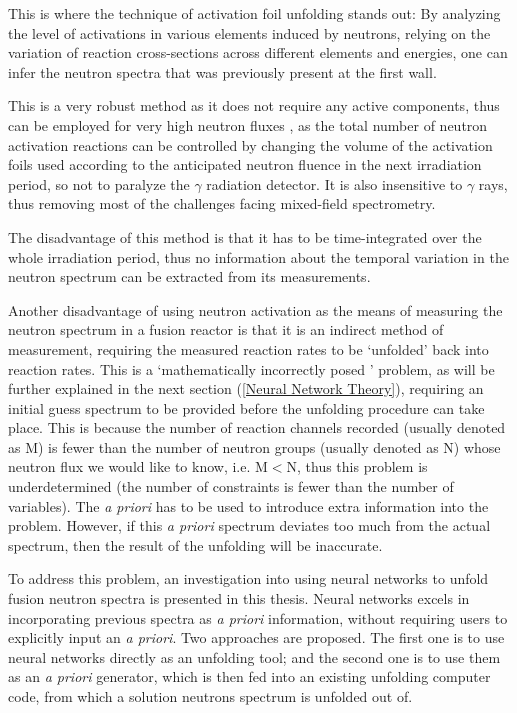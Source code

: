\documentclass[a4paper, 12pt]{article}
\begin{document}
This is where the technique of activation foil unfolding stands out: By analyzing the level of activations in various elements induced by neutrons, relying on the variation of reaction cross-sections across different elements and energies, one can infer the neutron spectra that was previously present at the first wall.

This is a very robust method as it does not require any active components, thus can be employed for very high neutron fluxes \cite{NSpecHistoricalReviewAndPresentStatus}, as the total number of neutron activation reactions can be controlled by changing the volume of the activation foils used \cite{bethColling_TBMD} according to the anticipated neutron fluence in the next irradiation period, so not to paralyze the $\gamma$ radiation detector. It is also insensitive to $\gamma$ rays, thus removing most of the challenges facing mixed-field spectrometry. \cite{NeutronSpectrometryInMixedFieldsMultiSphereSpectrometers}

The disadvantage of this method is that it has to be time-integrated over the whole irradiation period, thus no information about the temporal variation in the neutron spectrum can be extracted from its measurements.

Another disadvantage of using neutron activation as the means of measuring the neutron spectrum in a fusion reactor is that it is an indirect method of measurement, requiring the measured reaction rates to be `unfolded' back into reaction rates. This is a `mathematically incorrectly posed ' problem\cite{BirminghamUnfolding}, as will be further explained in the next section (\ref{Neural Network Theory}), requiring an initial guess spectrum to be provided before the unfolding procedure can take place. This is because the number of reaction channels recorded (usually denoted as M) is fewer than the number of neutron groups (usually denoted as N) whose neutron flux we would like to know, i.e. M$<$N, thus this problem is underdetermined (the number of constraints is fewer than the number of variables). The \emph{a priori} has to be used to introduce extra information into the problem. However, if this \emph{a priori} spectrum deviates too much from the actual spectrum, then the result of the unfolding will be inaccurate.

To address this problem, an investigation into using neural networks to unfold fusion neutron spectra is presented in this thesis.
Neural networks excels in incorporating previous spectra as \emph{a priori} information, without requiring users to explicitly input an \emph{a priori}.
Two approaches are proposed. The first one is to use neural networks directly as an unfolding tool; and the second one is to use them as an \emph{a priori} generator, which is then fed into an existing unfolding computer code, from which a solution neutrons spectrum is unfolded out of.
\end{document}
